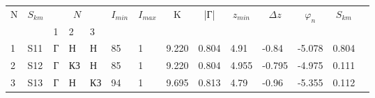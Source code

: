 \begin{tabular}{|l|l|l|l|l|l|l|l|l|l|l|l|l|l}
\cline{1-13}
\multicolumn{1}{|c|}{\multirow{2}{*}{N}} & \multicolumn{1}{c|}{\multirow{2}{*}{$S_{km}$}} & \multicolumn{3}{c|}{$N_{}$} & \multicolumn{1}{c|}{\multirow{2}{*}{$I_{min}$}} & \multicolumn{1}{c|}{\multirow{2}{*}{$I_{max}$}} & \multicolumn{1}{c|}{\multirow{2}{*}{K}} & \multicolumn{1}{c|}{\multirow{2}{*}{|Г|}} & \multicolumn{1}{c|}{\multirow{2}{*}{$z_{min}$}} & \multicolumn{1}{c|}{\multirow{2}{*}{$\Delta z$}} & \multicolumn{1}{c|}{\multirow{2}{*}{$\varphi_n$}} & \multicolumn{1}{c|}{\multirow{2}{*}{$S_{km}$}} &  \\ \cline{3-5}
\multicolumn{1}{|c|}{}                   & \multicolumn{1}{c|}{}                          & 1      & 2       & 3      & \multicolumn{1}{c|}{}                           & \multicolumn{1}{c|}{}                           & \multicolumn{1}{c|}{}                   & \multicolumn{1}{c|}{}                     & \multicolumn{1}{c|}{}                           & \multicolumn{1}{c|}{}                            & \multicolumn{1}{c|}{}                             & \multicolumn{1}{c|}{}                          &  \\ \cline{1-13}
1                                        & S11                                            & Г      & Н       & Н      & 85                                              & 1                                               & 9.220                                   & 0.804                                     & 4.91                                            & -0.84                                            & -5.078                                            & 0.804                                          &  \\ \cline{1-13}
2                                        & S12                                            & Г      & КЗ      & Н      & 85                                              & 1                                               & 9.220                                   & 0.804                                     & 4.955                                           & -0.795                                           & -4.975                                            & 0.111                                          &  \\ \cline{1-13}
3                                        & S13                                            & Г      & Н       & КЗ     & 94                                              & 1                                               & 9.695                                   & 0.813                                     & 4.79                                            & -0.96                                            & -5.355                                            & 0.112                                          &  \\ \cline{1-13}

\end{tabular}
